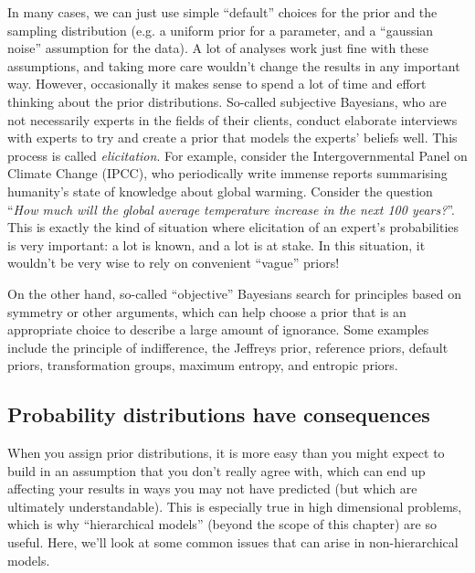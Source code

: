 In many cases, we can just use simple ``default'' choices for the prior and
the sampling distribution (e.g. a uniform prior for a parameter, and a
``gaussian noise'' assumption for the data). A lot of analyses work just fine
with these assumptions, and taking more care wouldn't change the results in
any important way. However, occasionally it makes sense to spend a lot of
time and effort thinking about the prior distributions.
So-called subjective Bayesians, who are not
necessarily experts in the fields of their clients, conduct elaborate interviews
with experts to try and create a prior that models the experts' beliefs well.
This process is called {\it elicitation}.
For example, consider the Intergovernmental Panel on Climate Change (IPCC),
who periodically write immense reports summarising humanity's state of knowledge
about global warming.
Consider the question ``{\it How much will the global average temperature
increase in the next 100 years?}''. This is exactly the kind of situation where
elicitation of an expert's probabilities is very important: a lot is known,
and a lot is at stake. In this situation, it wouldn't be very wise to rely on
convenient ``vague'' priors!

On the other hand, so-called ``objective'' Bayesians search for principles
based on symmetry or other arguments, which can help choose a prior that is
an appropriate choice to describe a large amount of ignorance. Some examples
include the principle of indifference, the Jeffreys prior, reference priors,
default priors, transformation groups, maximum entropy, and entropic priors.

\subsection{Probability distributions have consequences}
When you assign prior distributions, it is more easy than you might expect to
build in an assumption that you don't really agree with, which can end up
affecting your results in ways you may not have predicted (but which are
ultimately understandable). This is especially
true in high dimensional problems, which is why
``hierarchical models'' (beyond the scope of this chapter) are so useful.
Here, we'll look at some common issues that can arise in non-hierarchical
models.

